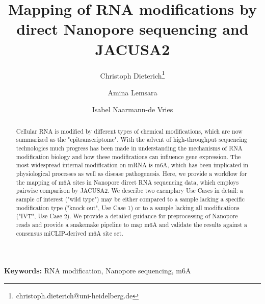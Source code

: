 \documentclass[times, 11pt, a4paper]{article}
\begin{document}
\providecommand{\keywords}[1]{\textbf{Keywords:} #1}

\title{\Large Mapping of RNA modifications by direct Nanopore sequencing and JACUSA2}

\date{}
\author[1,2,3]{Christoph Dieterich\thanks{christoph.dieterich@uni-heidelberg.de}}
\author[1,2]{Amina Lemsara}
\author[1,2,3]{Isabel Naarmann-de Vries}




\maketitle

\begin{abstract} %
Cellular RNA is modified by different types of chemical modifications, which are now summarized as the "epitranscriptome". With the advent of high-throughput sequencing technologies much progress has been made in understanding the mechanisms of RNA modification biology and how these modifications can influence gene expression. The most widespread internal modification on mRNA is m6A, which has been implicated in physiological processes as well as disease pathogenesis. Here, we provide a workflow for the mapping of m6A sites in Nanopore direct RNA sequencing data, which employs pairwise comparison by JACUSA2. We describe two exemplary Use Cases in detail: a sample of interest ("wild type") may be either compared to a sample lacking a specific modification type ("knock out", Use Case 1) or to a sample lacking all modifications ("IVT", Use Case 2). We provide a detailed guidance for preprocessing of Nanopore reads and provide a snakemake pipeline to map m6A and validate the results against a consensus miCLIP-derived m6A site set. 
\end{abstract}

\keywords{RNA modification, Nanopore sequencing, m6A}
\end{document}
